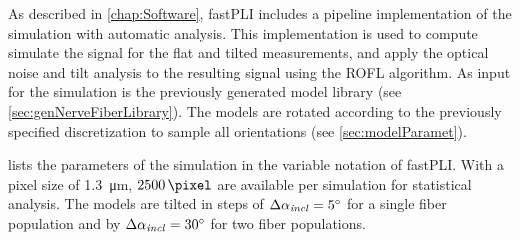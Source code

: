 %
As described in \cref{chap:Software}, \ac{fastPLI} includes a pipeline implementation of the simulation with automatic analysis.
This implementation is used to compute simulate the signal for the flat and tilted measurements, and apply the optical noise and tilt analysis to the resulting signal using the \ac{ROFL} algorithm. 
As input for the simulation is the previously generated model library (see \cref{sec:genNerveFiberLibrary}).
The models are rotated according to the previously specified discretization to sample all orientations (see \cref{sec:modelParamet}).
\par
% 
 lists the parameters of the simulation in the variable notation of \ac{fastPLI}.
With a pixel size of \SI{1.3}{\micro\meter}, $\SI{2500}{\pixel}$ are available per simulation for statistical analysis.
The models are tilted in steps of $\Delta \textnormal{$\alpha_{\mathit{incl}}$} = \SI{5}{\degree}$ for a single fiber population and by $\Delta \textnormal{$\alpha_{\mathit{incl}}$} = \SI{30}{\degree}$ for two fiber populations.
% 
% 
%
